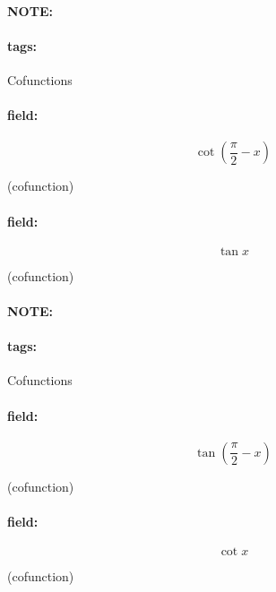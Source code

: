 \documentclass[12pt]{article}
\newenvironment{note}{\paragraph{NOTE:}}{}
\newenvironment{field}{\paragraph{field:}}{}
\newcommand*{\tags}[1]{\paragraph{tags: }#1}
\begin{document}
\begin{note}
    \tags{Cofunctions}
    \begin{field}
    \[  
        \cot(\frac{\pi}{2} - x)
    \] 
    \begin{center}
    (cofunction)
\end{center}
    \end{field}
    \begin{field}
    \[
        \tan x
    \] 
    \begin{center}
    (cofunction)
\end{center}
    \end{field}
\end{note}

\begin{note}
    \tags{Cofunctions}
    \begin{field}
    \[  
        \tan(\frac{\pi}{2} - x)
    \] 
    \begin{center}
    (cofunction)
    \end{center}
    \end{field}
    \begin{field}
    \[
        \cot x 
    \] 
    \begin{center}
    (cofunction)
    \end{center}
    \end{field}
\end{note}
\end{document}
